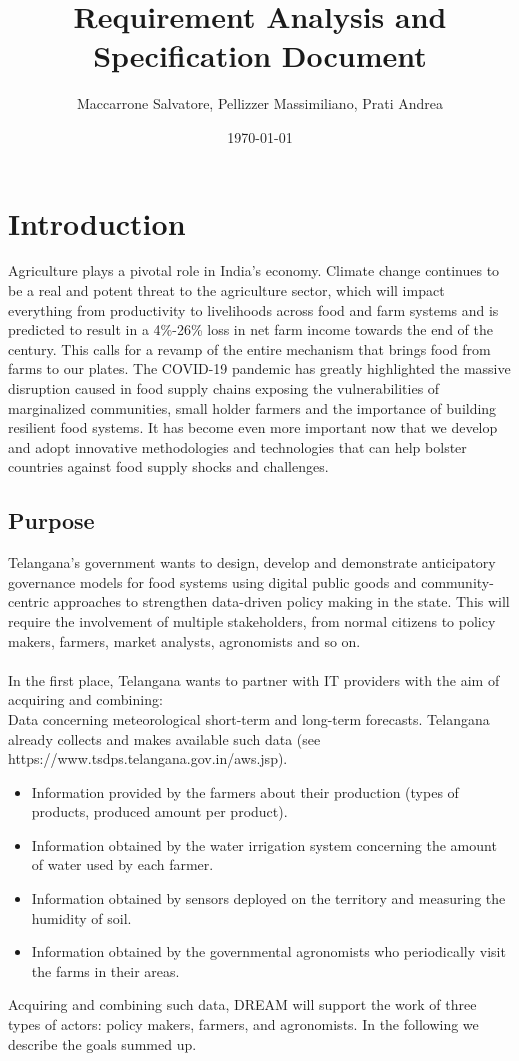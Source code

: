 \documentclass[10pt]{report}
\title{Requirement Analysis and Specification Document}
\author{Maccarrone Salvatore,   Pellizzer Massimiliano,   Prati Andrea}
\date{\today}
\begin{document}


\tableofcontents

\chapter{Introduction}
Agriculture plays a pivotal role in India’s economy. Climate change continues to be a real and potent threat to the agriculture sector, which will impact everything from productivity to livelihoods across food and farm systems and is predicted to result in a 4\%-26\% loss in net farm income towards the end of the century. This calls for a revamp of the entire mechanism that brings food from farms to our plates. The COVID-19 pandemic has greatly highlighted the massive disruption caused in food supply chains exposing the vulnerabilities of marginalized communities, small holder farmers and the importance of building resilient food systems. It has become even more important now that we develop and adopt innovative methodologies and technologies that can help bolster countries against food supply shocks and challenges.

    \section{Purpose}
    Telangana’s government wants to design, develop and demonstrate anticipatory governance models for food systems using digital public goods and community-centric approaches to strengthen data-driven policy making in the state. This will require the involvement of multiple stakeholders, from normal citizens to policy makers, farmers, market analysts, agronomists and so on. \\ \\
    In the first place, Telangana wants to partner with IT providers with the aim of acquiring and combining: \\ 
    Data concerning meteorological short-term and long-term forecasts. Telangana already collects and makes available such data (see https://www.tsdps.telangana.gov.in/aws.jsp).
    \begin{itemize}
    \item Information provided by the farmers about their production (types of products, produced amount per product). 
    \item Information obtained by the water irrigation system concerning the amount of water used by each farmer. 
    \item Information obtained by sensors deployed on the territory and measuring the humidity of soil.
    \item Information obtained by the governmental agronomists who periodically visit the farms in their areas.
    \end{itemize}
    Acquiring and combining such data, DREAM will support the work of three types of actors: policy makers, farmers, and agronomists. In the following we describe the goals summed up.
\end{document}
